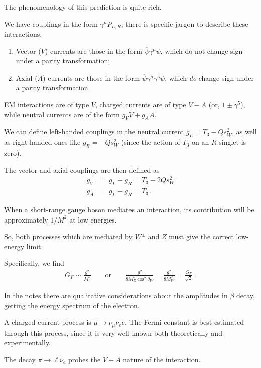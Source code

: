 \documentclass[main.tex]{subfiles}
\begin{document}
The phenomenology of this prediction is quite rich. 

We have couplings in the form \(\gamma^{\mu } P_{L, R}\), there is specific jargon to describe these interactions. 
\begin{enumerate}
    \item Vector (\(V\)) currents are those in the form \(\overline{\psi} \gamma^{\mu } \psi \), which do not change sign under a parity transformation;
    \item Axial (\(A\)) currents are those in the form \(\overline{\psi} \gamma^{\mu } \gamma^{5} \psi \), which \emph{do} change sign under a parity transformation.
\end{enumerate}

EM interactions are of type \(V\), charged currents are of type \(V - A\) (or, \(1 \pm \gamma^{5}\)), while neutral currents are of the form \(g_V V + g_A A\). 

We can define left-handed couplings in the neutral current \(g_L = T_3 - Q s^2_W\), as well as right-handed ones like \(g_R = - Q s^2_W\) (since the action of \(T_3\) on an \(R\) singlet is zero). 

The vector and axial couplings are then defined as 
%
\begin{align}
g_V &= g_L + g_R = T_3 - 2 Q s_W^2  \\
g_A &= g_L - g_R = T_3
\,.
\end{align}

When a short-range gauge boson mediates an interaction, its contribution will be approximately \(1/M^2\) at low energies. 

So, both processes which are mediated by \(W^{\pm}\) and \(Z\) must give the correct low-energy limit.

Specifically, we find 
%
\begin{align}
G_F \sim \frac{g^2}{M^2} \qquad \text{or} \qquad
\frac{g^2}{8 M_Z^2 \cos^2 \theta _W} = \frac{g^2}{8 M_W^2} = \frac{G_F}{\sqrt{2}}
\,.
\end{align}

In the notes there are qualitative considerations about the amplitudes in \(\beta \) decay, getting the energy spectrum of the electron. 

A charged current process is \(\mu \to \nu _\mu \overline{\nu}_e e\). The Fermi constant is best estimated through this process, since it is very well-known both theoretically and experimentally. 

The decay \(\pi \to \ell \overline{\nu}_e\) probes the \(V-A\) nature of the interaction. 
\end{document}
